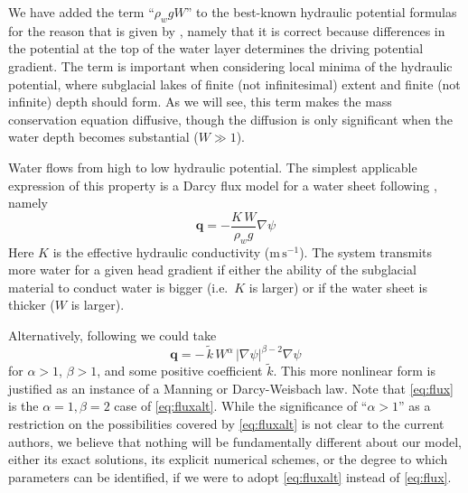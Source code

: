 \documentclass[11pt,final]{amsart}%
\newcommand\bq{\mathbf{q}}
\newcommand{\grad}{\nabla}
\begin{document}
We have added the term ``$\rho_w g W$'' to the best-known hydraulic potential formulas \citep[e.g.]{Clarke05} for the reason that is given by \cite{Hewittetal2012}, namely that it is correct because differences in the potential at the top of the water layer determines the driving potential gradient.  The term is important when considering local minima of the hydraulic potential, where subglacial lakes of finite (not infinitesimal) extent and finite (not infinite) depth should form.  As we will see, this term makes the mass conservation equation diffusive, though the diffusion is only significant when the water depth becomes substantial ($W\gg 1$).

Water flows from high to low hydraulic potential.  The simplest applicable expression of this property is a Darcy flux model for a water sheet following \cite{Clarke05}, namely
\begin{equation}  \label{eq:flux}
\bq = - \frac{K \, W}{\rho_w g} \grad \psi
\end{equation}
Here $K$ is the effective hydraulic conductivity ($\text{m}\,\text{s}^{-1}$).  The system transmits more water for a given head gradient if either the ability of the subglacial material to conduct water is bigger (i.e.~$K$ is larger) or if the water sheet is thicker ($W$ is larger).

Alternatively, following \cite{Schoofetal2012} we could take
\begin{equation}  \label{eq:fluxalt}
\bq = - \,\tilde k\, W^\alpha\, |\grad \psi|^{\beta-2} \grad \psi
\end{equation}
for $\alpha> 1$, $\beta>1$, and some positive coefficient $\tilde k$.  This more nonlinear form is justified as an instance of a Manning or Darcy-Weisbach law.  Note that \eqref{eq:flux} is the $\alpha=1,\beta=2$ case of \eqref{eq:fluxalt}.  While the significance of ``$\alpha>1$'' as a restriction on the possibilities covered by \eqref{eq:fluxalt} is not clear to the current authors, we believe that nothing will be fundamentally different about our model, either its exact solutions, its explicit numerical schemes, or the degree to which parameters can be identified, if we were to adopt \eqref{eq:fluxalt} instead of \eqref{eq:flux}.

\end{document}
